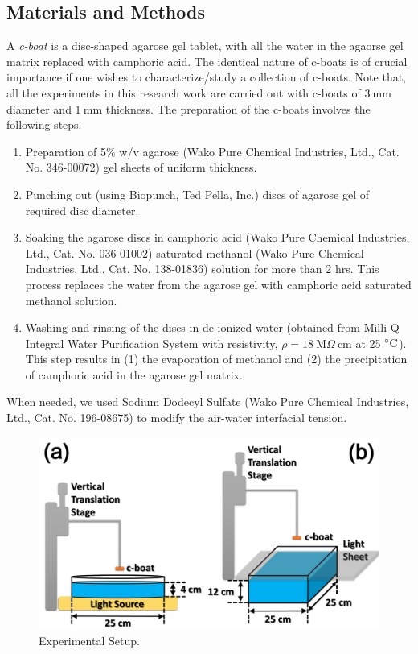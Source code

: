 \documentclass[aps, twocolumn, floatfix, superscriptaddress]{revtex4}
\begin{document}
\subsection{Materials and Methods}
\label{sec:prep}
A \emph{c-boat} is a disc-shaped agarose gel tablet, with all the water in the agaorse gel matrix replaced with camphoric acid. The identical nature of c-boats is of crucial importance if one wishes to characterize/study a collection of c-boats. Note that, all the experiments in this research work are carried out with c-boats of $3\ \mathrm{mm}$ diameter and $1\ \mathrm{mm}$ thickness. The preparation of the c-boats involves the following steps. 
\begin{enumerate}
\item Preparation of 5\% w/v agarose (Wako Pure Chemical Industries, Ltd., Cat. No. 346-00072) gel sheets of uniform thickness.
\item Punching out (using Biopunch, Ted Pella, Inc.) discs of agarose gel of required disc diameter. 
\item Soaking the agarose discs in camphoric acid (Wako Pure Chemical Industries, Ltd., Cat. No. 036-01002) saturated methanol (Wako Pure Chemical Industries, Ltd., Cat. No. 138-01836) solution for more than 2 hrs. This process replaces the water from the agarose gel with camphoric acid saturated methanol solution. 
\item Washing and rinsing of the discs in de-ionized water (obtained from Milli-Q Integral Water Purification System with resistivity, $\rho=\mathrm{18\ M} \Omega\ \mathrm{cm}$ at 25 $\celsius$). This step results in (1) the evaporation of methanol and (2) the precipitation of camphoric acid in the agarose gel matrix.
\end{enumerate}
When needed, we used Sodium Dodecyl Sulfate (Wako Pure Chemical Industries, Ltd., Cat. No. 196-08675) to modify the air-water interfacial tension.
\label{sec:expset}
\begin{figure}[ht]
    \begin{center}
       \includegraphics[scale=0.25]{figure1.pdf}
    \end{center}
    \caption{Experimental Setup.}
    \label{fig:expset}
\end{figure}
\end{document}
